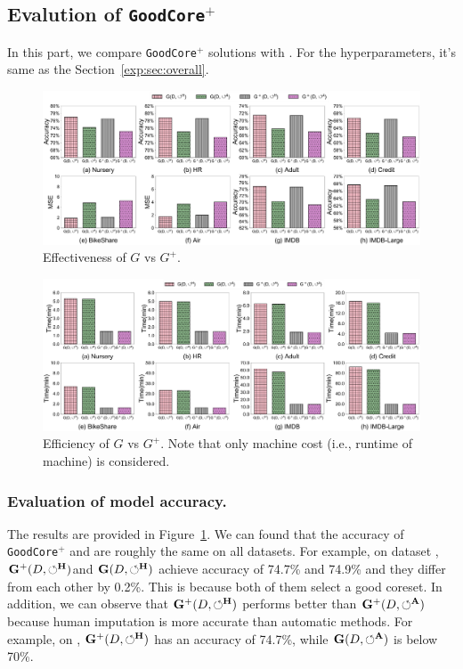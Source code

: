 \subsection{Evalution of \texttt{GoodCore}$^+$}
\label{exp:sec:G+}

In this part, we compare \texttt{GoodCore}$^+$ solutions with \ours. For the hyperparameters, it's same as the Section~\ref{exp:sec:overall}.

\begin{figure}
	\centering
	\includegraphics[width=\textwidth]{figs/effectiveness_new}
	\caption{Effectiveness of $G$ vs $G^+$.}
	\label{fig:effectiveness_new}
\end{figure}

\begin{figure}
	\centering
	\includegraphics[width=\textwidth]{figs/efficiency_new}
	\caption{Efficiency of $G$ vs $G^+$. Note that only machine cost (i.e., runtime of machine) is considered.}
	\label{fig:efficiency_new}
\end{figure}


\subsubsection{Evaluation of model accuracy.}
The results are provided in Figure~\ref{fig:effectiveness_new}. We can found that the accuracy of \texttt{GoodCore}$^+$ and \ours are roughly the same on all datasets. For example, on dataset \imdbl,  $\mathbf{G}^+(D,\circlearrowleft^\mathbf{H})$and $\mathbf{G}(D,\circlearrowleft^\mathbf{H})$ achieve accuracy of 74.7\% and 74.9\% and they differ from each other by 0.2\%. This is because both of them   select a good coreset. In addition, we can observe that $\mathbf{G}^+(D,\circlearrowleft^\mathbf{H})$ performs better than $\mathbf{G}^+(D,\circlearrowleft^\mathbf{A})$ because human imputation is more accurate than automatic methods. For example, on \imdbl,  $\mathbf{G}^+(D,\circlearrowleft^\mathbf{H})$ has an accuracy of 74.7\%, while $\mathbf{G}(D,\circlearrowleft^\mathbf{A})$ is below 70\%.

